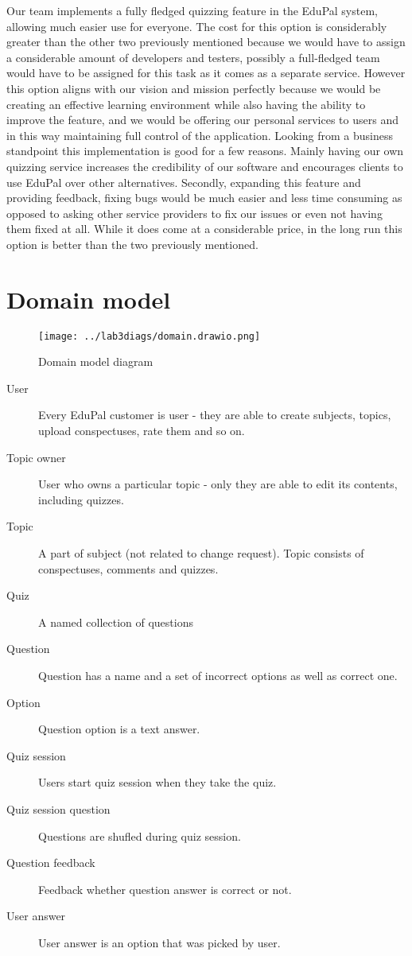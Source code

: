 \documentclass[
    english, %
]{VUMIFPSkursinis}
\begin{document}
Our team implements a fully fledged quizzing feature in the EduPal system, allowing much easier use for everyone. The cost for this option is considerably greater than the other two previously mentioned because we would have to assign a considerable amount of developers and testers, possibly a full-fledged team would have to be assigned for this task as it comes as a separate service. However this option aligns with our vision and mission perfectly because we would be creating an effective learning environment while also having the ability to improve the feature, and we would be offering our personal services to users and in this way maintaining full control of the application. Looking from a business standpoint this implementation is good for a few reasons. Mainly having our own quizzing service increases the credibility of our software and encourages clients to use EduPal over other alternatives. Secondly, expanding this feature and providing feedback, fixing bugs would be much easier and less time consuming as opposed to asking other service providers to fix our issues or even not having them fixed at all. While it does come at a considerable price, in the long run this option is better than the two previously mentioned.

\section{Domain model}

\begin{figure}[ht]
    \centering
    \texttt{[image: ../lab3diags/domain.drawio.png]}
    \caption{Domain model diagram}
    \label{domain-model}
\end{figure}

\begin{description}
    \item[User] Every EduPal customer is user - they are able to create subjects, topics, upload conspectuses, rate them and so on.
    \item[Topic owner] User who owns a particular topic - only they are able to edit its contents, including quizzes.
    \item[Topic] A part of subject (not related to change request). Topic consists of conspectuses, comments and quizzes.
    \item[Quiz] A named collection of questions
    \item[Question] Question has a name and a set of incorrect options as well as correct one.
    \item[Option] Question option is a text answer.
    \item[Quiz session] Users start quiz session when they take the quiz.
    \item[Quiz session question] Questions are shufled during quiz session.
    \item[Question feedback] Feedback whether question answer is correct or not.
    \item[User answer] User answer is an option that was picked by user.
\end{description}
\end{document}
